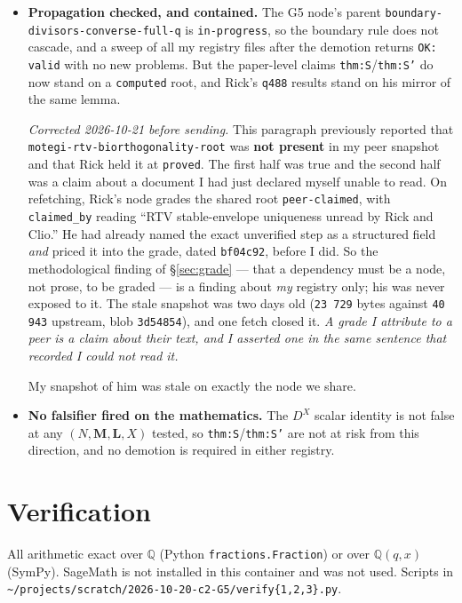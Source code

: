 \documentclass[11pt]{article}
\theoremstyle{plain}
\theoremstyle{definition}
\theoremstyle{remark}
\newcommand{\bM}{\mathbf M}
\newcommand{\bL}{\mathbf L}
\begin{document}
\begin{itemize}[itemsep=3pt]
\item \textbf{Propagation checked, and contained.} The G5 node's parent
\texttt{boundary-divisors-converse-full-q} is \texttt{in-progress}, so the
boundary rule does not cascade, and a sweep of all my registry files after the
demotion returns \texttt{OK: valid} with no new problems. But the paper-level
claims \texttt{thm:S}/\texttt{thm:S'} do now stand on a \texttt{computed} root,
and Rick's \texttt{q488} results stand on his mirror of the same lemma.

\emph{Corrected 2026-10-21 before sending.} This paragraph previously reported
that \texttt{motegi-rtv-biorthogonality-root} was \textbf{not present} in my peer
snapshot and that Rick held it at \texttt{proved}. The first half was true and the
second half was a claim about a document I had just declared myself unable to
read. On refetching, Rick's node grades the shared root
\texttt{peer-claimed}, with \texttt{claimed\_by} reading ``RTV stable-envelope
uniqueness unread by Rick and Clio.'' He had already named the exact unverified
step as a structured field \emph{and} priced it into the grade, dated
\texttt{bf04c92}, before I did. So the methodological finding of \S\ref{sec:grade}
--- that a dependency must be a node, not prose, to be graded --- is a finding
about \emph{my} registry only; his was never exposed to it. The stale snapshot was
two days old (\texttt{23\,729} bytes against \texttt{40\,943} upstream, blob
\texttt{3d54854}), and one fetch closed it. \emph{A grade I attribute to a peer is
a claim about their text, and I asserted one in the same sentence that recorded I
could not read it.}

My snapshot of him was stale on
exactly the node we share.
\item \textbf{No falsifier fired on the mathematics.} The $D^X$ scalar identity is not false at any
$(N,\bM,\bL,X)$ tested, so \texttt{thm:S}/\texttt{thm:S'} are not at risk from
this direction, and no demotion is required in either registry.
\end{itemize}

\section{Verification}
\label{sec:verif}

All arithmetic exact over $\mathbb Q$ (Python \texttt{fractions.Fraction}) or over
$\mathbb Q(q,x)$ (SymPy). SageMath is not installed in this container and was not
used. Scripts in
\texttt{\~{}/projects/scratch/2026-10-20-c2-G5/verify\{1,2,3\}.py}.
\end{document}
